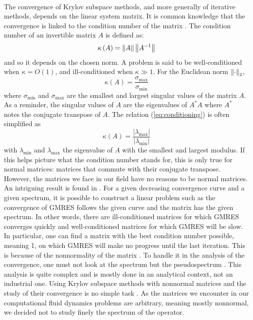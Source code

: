       \paragraph{}
      The convergence of Krylov subspace methods, and more generally of iterative methods, depends on the linear system matrix.
      It is common knowledge that the convergence is linked to the condition number of the matrix \cite{Nevanlinna1994}.
      The condition number of an invertible matrix $A$ is defined as:
      \begin{equation}
        \kappa\left( A \right) = \norm{A} \norm{A^{-1}}
      \end{equation}
      and so it depends on the chosen norm.
      A problem is said to be well-conditioned when $\kappa = O\left(1\right)$, and ill-conditioned when $\kappa \gg 1$.
      For the Euclidean norm $\norm[2]{\cdot}$,
  		\begin{equation}\label{eq:conditioning}
  			\kappa\left( A \right) = \frac{\sigma_{\max}}{\sigma_{\min}}
  		\end{equation}
      where $\sigma_{\min}$ and $\sigma_{\max}$ are the smallest and largest singular values of the matrix $A$.
      As a reminder, the singular values of $A$ are the eigenvalues of $A^* A$ where $A^*$ notes the conjugate transpose of $A$.
      The relation (\ref{eq:conditioning}) is often simplified as
      \begin{equation}
        \kappa\left( A \right) = \frac{\left|\lambda_{\max}\right|}{\left|\lambda_{\min}\right|}
      \end{equation}
      with $\lambda_{\min}$ and $\lambda_{\max}$ the eigenvalue of $A$ with the smallest and largest modulus.
      If this helps picture what the condition number stands for, this is only true for normal matrices: matrices that commute with their conjugate transpose.
      However, the matrices we face in our field have no reasons to be normal matrices.
      An intriguing result is found in \cite{GreenbaumPtakStrakos1996}.
      For a given decreasing convergence curve and a given spectrum, it is possible to construct a linear problem such as the convergence of GMRES follows the given curve and the matrix has the given spectrum.
      In other words, there are ill-conditioned matrices for which GMRES converges quickly and well-conditioned matrices for which GMRES will be slow.
      In particular, one can find a matrix with the best condition number possible, meaning 1, on which GMRES will make no progress until the last iteration.
      This is because of the nonnormality of the matrix \cite{GreenbaumStrakos1994, GreenbaumPtakStrakos1996}.
      To handle it in the analysis of the convergence, one must not look at the spectrum but the pseudospectrum \cite{Trefethen1991, Trefethen1999}.
      This analysis is quite complex and is mostly done in an analytical context, not an industrial one.
      Using Krylov subspace methods with nonnormal matrices and the study of their convergence is no simple task \cite{LiesenTichy2004, Huhtanen2005}.
      As the matrices we encounter in our computational fluid dynamics problems are arbitrary, meaning mostly nonnormal, we decided not to study finely the spectrum of the operator.

